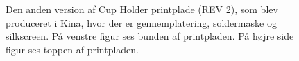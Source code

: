 \documentclass[Rapport/Rapport_main.tex]{subfiles}
\begin{document}
\begin{figure}[H]
{\begin{subfigure}{.57\textwidth}
\end{subfigure}
}
\caption{Den anden version af Cup Holder printplade (REV 2), som blev produceret i Kina, hvor der er gennemplatering, soldermaske og silkscreen. På venstre figur ses bunden af printpladen. På højre side figur ses toppen af printpladen.}
\label{fig:CupHolderRev2}
\end{figure}
\end{document}
